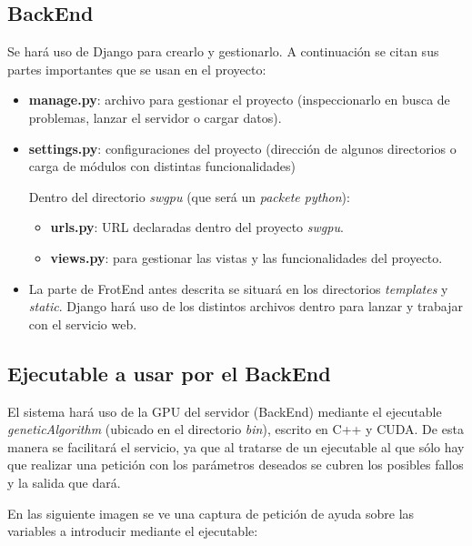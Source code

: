 \bigskip
\subsection{BackEnd}
\bigskip

Se hará uso de Django para crearlo y gestionarlo. A continuación se citan sus partes importantes que se usan en el proyecto:

\begin{itemize}

	\item \textbf{manage.py}: archivo para gestionar el proyecto (inspeccionarlo en busca de problemas, lanzar el servidor o cargar datos).
	\item \textbf{settings.py}: configuraciones del proyecto (dirección de algunos directorios o carga de módulos con distintas funcionalidades)
	
	Dentro del directorio \textit{swgpu} (que será un \textit{packete python}):
	\begin{itemize}
		\item \textbf{urls.py}: URL declaradas dentro del proyecto \textit{swgpu}.
		\item \textbf{views.py}: para gestionar las vistas y las funcionalidades del proyecto.
	\end{itemize}
	
	
	\item La parte de FrotEnd antes descrita se situará en los directorios \textit{templates} y \textit{static}. Django hará uso de los distintos archivos dentro para lanzar y trabajar con el servicio web.
\end{itemize}

\bigskip
\subsection{Ejecutable a usar por el BackEnd}
\bigskip

El sistema hará uso de la GPU del servidor (BackEnd) mediante el ejecutable \textit{geneticAlgorithm} (ubicado en el directorio \textit{bin}), escrito en C++ y CUDA. De esta manera se facilitará el servicio, ya que al tratarse de un ejecutable al que sólo hay que realizar una petición con los parámetros deseados se cubren los posibles fallos y la salida que dará. 

\bigskip
En las siguiente imagen se ve una captura de petición de ayuda sobre las variables a introducir mediante el ejecutable:


